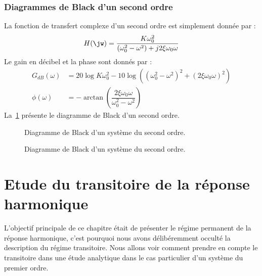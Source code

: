 \subsubsection{Diagrammes de Black d'un second ordre}
La fonction de transfert complexe d'un second ordre est simplement donnée par :
\[
    H(\jw)=\dfrac{K\omega_0^2}{(\omega_0^2-\omega^2)+j2\xi\omega_0\omega}
\]
Le gain en décibel et la phase sont donnés par :
\begin{align*}
    G_{dB}(\omega)&=20\log{K\omega_0^2}-10
                    \log{\left((\omega_0^2-\omega^2)^2+
                               (2\xi\omega_0\omega)^2\right)} \\
      \phi(\omega)&=-\arctan{\left(\dfrac{2\xi\omega_0\omega}
                                         {\omega_0^2-\omega^2}\right)}
\end{align*}
La~\cref{fig-black_4} présente le diagramme de Black d'un second ordre.
\begin{figure}[!h]
    \centering
    
    \caption{Diagramme de Black d'un système du second ordre. 
    \label{fig-black_4}}
\end{figure}
\begin{figure}[!h]
    \centering
    
    \caption{Diagramme de Black d'un système du second ordre. 
    \label{fig-black_5}}
\end{figure}
\clearpage
\restoregeometry
\captionsetup{width=0.9\linewidth}
\section{Etude du transitoire de la réponse harmonique}
L'objectif principale de ce chapitre était de présenter le régime permanent
de la réponse harmonique, c'est pourquoi nous avons délibéremment occulté 
la description du régime transitoire.
Nous allons voir comment prendre en compte le transitoire dans une étude
analytique dans le cas particulier d'un système du premier ordre.
